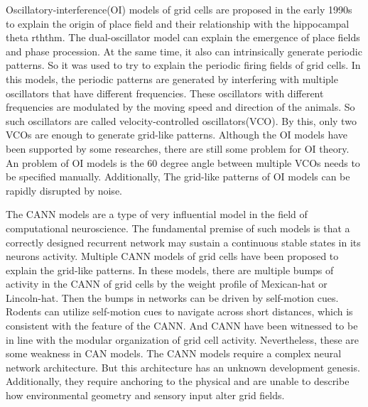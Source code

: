 \documentclass[preprint,12pt]{elsarticle}
\begin{document}
Oscillatory-interference(OI) models of grid cells are proposed in the early 1990s to explain the origin of place field and their relationship with the hippocampal theta rththm\cite{OKeefe2005,Burgess2007,Hasselmo2007,Pastoll2013,Burgess2008}. The dual-oscillator model can explain the emergence of place fields and phase procession\cite{OKeefe2005}. At the same time, it also can intrinsically generate periodic patterns. So it was used to try to explain the periodic firing fields of grid cells\cite{DAlbis2018}. In this models, the periodic patterns are generated by interfering with multiple oscillators that have different frequencies. These oscillators with different frequencies are modulated by the moving speed and direction of the animals. So such oscillators are called velocity-controlled oscillators(VCO). By this, only two VCOs are enough to generate grid-like patterns. 
Although the OI models have been supported by some researches\cite{Schmidt-Hieber2013,Domnisoru2013,Welday2011,Koenig2011,Brandon2011,Giocomo2007,Hafting2005,Alonso1989}, there are still some problem for OI theory. An problem of OI models is the 60 degree angle between multiple VCOs needs to be specified manually. Additionally, The grid-like patterns of OI models can be rapidly disrupted by noise\cite{DAlbis2018}.


The CANN models are a type of very influential model in the field of computational neuroscience. The fundamental premise of such models is that a correctly designed recurrent network may sustain a continuous stable states in its neurons activity\cite{Taylor1999,Amari1977}. Multiple CANN models of grid cells have been proposed to explain the grid-like patterns\cite{Fuhs2006,Burak2009,Guanella2007,Shipston-Sharman2016,Couey2013}. In these models, there are multiple bumps of activity in the CANN of grid cells by the weight profile of Mexican-hat or Lincoln-hat\cite{Rowland2016}. Then the bumps in networks can be driven by self-motion cues. Rodents can utilize self-motion cues to navigate across short distances, which is consistent with the feature of the CANN. And CANN have been witnessed to be in line with the modular organization of grid cell activity\cite{Stensola2012,Yoon2013}. Nevertheless, these are some weakness in CAN models. The CANN models require a complex neural network architecture. But this architecture has an unknown development genesis. Additionally, they require anchoring to the physical and are unable to describe how environmental geometry and sensory input alter grid fields\cite{DAlbis2017}.
\end{document}
